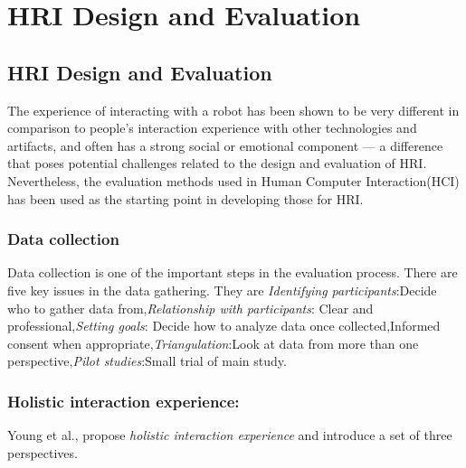 
\chapter{HRI Design and Evaluation} %

\label{Chapter6} %


\section{HRI Design and Evaluation}
The experience of interacting with a robot has been shown to be very different in comparison to people’s interaction experience with other technologies and artifacts, and often has a strong social or emotional component — a difference that poses potential challenges related to the design and evaluation of HRI. Nevertheless, the evaluation methods used in Human Computer Interaction(HCI) has been used as the starting point in developing those for HRI. 

\subsection{Data collection}
	Data collection is one of the important steps in the evaluation process. There are five key issues in the data gathering\cite{Rogers2011}. They are \emph{Identifying participants}:Decide who to gather data from,\emph{Relationship with participants}: Clear and professional,\emph{Setting goals}: Decide how to analyze data once collected,Informed consent when appropriate,\emph{Triangulation}:Look at data from more than one perspective,\emph{Pilot studies}:Small trial of main study. 

\subsection{Holistic interaction experience:}
Young et al.,\cite{Young2011} propose \emph{holistic interaction experience} and introduce a set of three perspectives.

